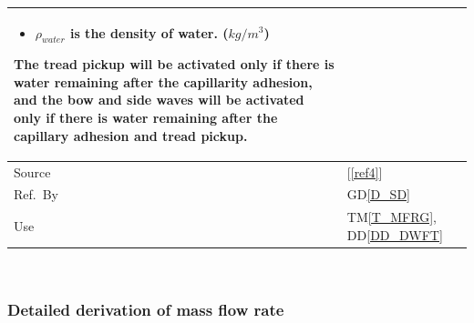 \documentclass[12pt]{article}
\newcommand{\colAwidth}{0.13\textwidth}
\newcommand{\colBwidth}{0.82\textwidth}
\newcommand{\dref}[1]{GD\ref{#1}}
\newcommand{\ddref}[1]{DD\ref{#1}}
\newcommand{\tref}[1]{TM\ref{#1}}
\newcommand{\reref}[1]{\ref{#1}}
\begin{document}
\begin{minipage}{\textwidth}
\begin{tabular}{| p{\colAwidth} | p{\colBwidth}|}
\begin{itemize}
\item $\rho_{water}$ is the density of water. ($kg/m^{3}$)

\end{itemize}

The tread pickup will be activated only if there is water remaining after the capillarity adhesion, and the bow and side waves will be activated only if there is water remaining after the capillary adhesion and tread pickup.
\\
\hline
  Source & [\reref{ref4}] \\
  \hline
  Ref.\ By & \dref{D_SD} \\ %
  \hline
  Use\ & \tref{T_MFRG}, \ddref{DD_DWFT}\\
  \hline
\end{tabular}

\end{minipage}\\


\subsubsection*{Detailed derivation of mass flow rate}
\end{document}
